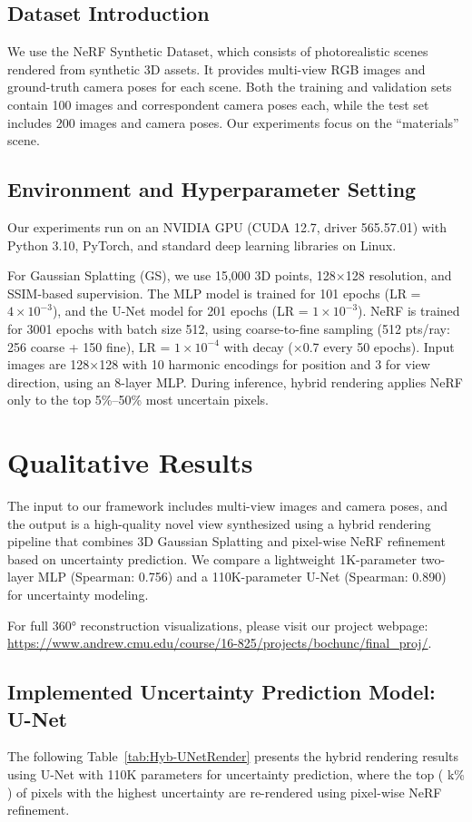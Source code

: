 \documentclass[10pt,letterpaper]{article}
\begin{document}
\subsection{Dataset Introduction}
We use the NeRF Synthetic Dataset, which consists of photorealistic scenes rendered from synthetic 3D assets. It provides multi-view RGB images and ground-truth camera poses for each scene. Both the training and validation sets contain 100 images and correspondent camera poses each, while the test set includes 200 images and camera poses. Our experiments focus on the “materials” scene.

\subsection{Environment and Hyperparameter Setting}
Our experiments run on an NVIDIA GPU (CUDA 12.7, driver 565.57.01) with Python 3.10, PyTorch, and standard deep learning libraries on Linux.

For Gaussian Splatting (GS), we use 15,000 3D points, 128×128 resolution, and SSIM-based supervision. The MLP model is trained for 101 epochs (LR = $4 \times 10^{-3}$), and the U-Net model for 201 epochs (LR = $1 \times 10^{-3}$). NeRF is trained for 3001 epochs with batch size 512, using coarse-to-fine sampling (512 pts/ray: 256 coarse + 150 fine), LR = $1 \times 10^{-4}$ with decay (×0.7 every 50 epochs). Input images are 128×128 with 10 harmonic encodings for position and 3 for view direction, using an 8-layer MLP. During inference, hybrid rendering applies NeRF only to the top 5\%–50\% most uncertain pixels.



\section{Qualitative Results}
 The input to our framework includes multi-view images and camera poses, and the output is a high-quality novel view synthesized using a hybrid rendering pipeline that combines 3D Gaussian Splatting and pixel-wise NeRF refinement based on uncertainty prediction. We compare a lightweight 1K-parameter two-layer MLP (Spearman: 0.756) and a 110K-parameter U-Net (Spearman: 0.890) for uncertainty modeling.
 
 For full 360° reconstruction visualizations, please visit our project webpage: \url{https://www.andrew.cmu.edu/course/16-825/projects/bochunc/final_proj/}.
 
 
\subsection{Implemented Uncertainty Prediction Model: U-Net}
The following Table~\ref{tab:Hyb-UNetRender} presents the hybrid rendering results using U-Net with 110K parameters for uncertainty prediction, where the top ( k\% ) of pixels with the highest uncertainty are re-rendered using pixel-wise NeRF refinement.
\end{document}
